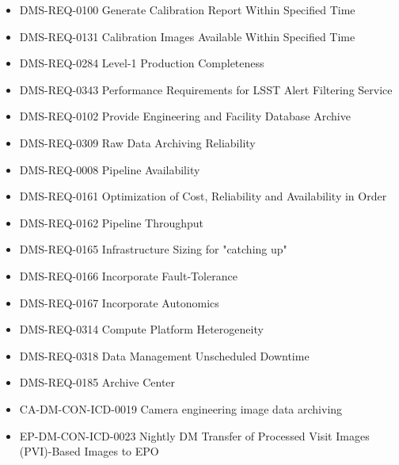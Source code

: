 \begin{itemize}
\item DMS-REQ-0100 Generate Calibration Report Within Specified Time
\item DMS-REQ-0131 Calibration Images Available Within Specified Time
\item DMS-REQ-0284 Level-1 Production Completeness
\item DMS-REQ-0343 Performance Requirements for LSST Alert Filtering Service
\item DMS-REQ-0102 Provide Engineering and Facility Database Archive
\item DMS-REQ-0309 Raw Data Archiving Reliability
\item DMS-REQ-0008 Pipeline Availability
\item DMS-REQ-0161 Optimization of Cost, Reliability and Availability in Order
\item DMS-REQ-0162 Pipeline Throughput
\item DMS-REQ-0165 Infrastructure Sizing for "catching up"
\item DMS-REQ-0166 Incorporate Fault-Tolerance
\item DMS-REQ-0167 Incorporate Autonomics
\item DMS-REQ-0314 Compute Platform Heterogeneity
\item DMS-REQ-0318 Data Management Unscheduled Downtime
\item DMS-REQ-0185 Archive Center
\item CA-DM-CON-ICD-0019 Camera engineering image data archiving
\item EP-DM-CON-ICD-0023 Nightly DM Transfer of Processed Visit Images (PVI)-Based Images to EPO
\end{itemize}
